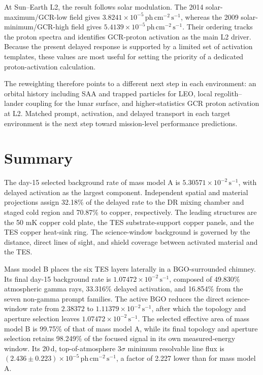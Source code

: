 \documentclass[11pt]{article}
\newcommand{\phcms}{\ensuremath{\,\mathrm{ph\,cm^{-2}\,s^{-1}}}}
\newcommand{\cps}{\ensuremath{\,\mathrm{s^{-1}}}}
\begin{document}
At Sun--Earth L2, the result follows solar modulation. The 2014
solar-maximum/GCR-low field gives $3.8241\times10^{-5}\phcms$, whereas the 2009
solar-minimum/GCR-high field gives $5.4139\times10^{-5}\phcms$. Their ordering
tracks the proton spectra and identifies GCR-proton activation as the main L2
driver. Because the present delayed response is supported by a limited set of
activation templates, these values are most useful for setting the priority of
a dedicated proton-activation calculation.

The reweighting therefore points to a different next step in each environment:
an orbital history including SAA and trapped particles for LEO, local
regolith--lander coupling for the lunar surface, and higher-statistics GCR
proton activation at L2. Matched prompt, activation, and delayed transport in
each target environment is the next step toward mission-level performance
predictions.

\FloatBarrier

\section{Summary}
\label{sec:summary}

The day-15 selected background rate of mass model A is
$5.30571\times10^{-2}\cps$, with delayed activation as the largest component.
Independent spatial and material projections assign 32.18\% of the delayed
rate to the DR mixing chamber and staged cold region and 70.87\% to copper,
respectively. The leading structures are the
50 mK copper cold plate, the TES substrate-support copper panels, and the TES
copper heat-sink ring. The science-window background is governed by the
distance, direct lines of sight, and shield coverage between activated material
and the TES.

Mass model B places the six TES layers laterally in a BGO-surrounded chimney.
Its final day-15 background rate is $1.07472\times10^{-2}\cps$, composed of
49.830\% atmospheric gamma rays, 33.316\% delayed activation, and
16.854\% from the seven non-gamma prompt families. The active BGO reduces the
direct science-window rate from $2.38372$ to
$1.11379\times10^{-2}\cps$, after which the topology and aperture selection
leaves $1.07472\times10^{-2}\cps$. The selected effective area of mass model B
is 99.75\% of that of mass model A, while its final topology and aperture
selection retains 98.249\% of the focused signal in its own measured-energy
window. Its 20\,d, top-of-atmosphere $3\sigma$ minimum resolvable line flux is
$(2.436\pm0.223)\times10^{-5}\phcms$, a factor of 2.227 lower than for mass
model A.
\end{document}
